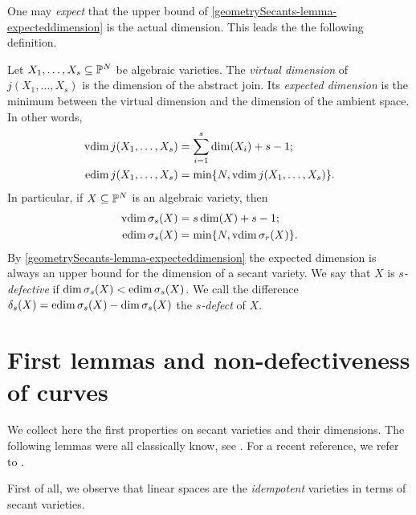 One may {\it expect} that the upper bound of \ref{geometrySecants-lemma-expecteddimension} is the actual dimension. This leads the the following definition. 
\begin{definition}
\label{geometrySecants-definition-expecteddimension}
    Let $X_1, \ldots , X_s \subseteq \mathbb{P}^N$ be algebraic varieties. The {\it virtual dimension} of $j(X_1,\ldots,X_s)$ is the dimension of the abstract join. Its {\it expected dimension} is the minimum between the virtual dimension and the dimension of the ambient space. In other words,
    \begin{align*}
        \operatorname{vdim} j(X_1,\ldots,X_s) & = \sum_{i=1}^s \dim(X_i) + s-1; \\ 
        \operatorname{edim} j(X_1,\ldots,X_s) & = \min \{N,\operatorname{vdim} j(X_1,\ldots,X_s)\}.
    \end{align*}
    In particular, if $X \subseteq \mathbb{P}^N$ is an algebraic variety, then
    \begin{align*}
        \operatorname{vdim} \sigma_s(X) & = s\dim(X) + s-1; \\ 
        \operatorname{edim} \sigma_s(X) & = \min \{N,\operatorname{vdim} \sigma_r(X)\}.
    \end{align*}
By \ref{geometrySecants-lemma-expecteddimension} the expected dimension is always an upper bound for the dimension of a secant variety. We say that $X$ is \emph{$s$-defective} if $\dim \sigma_s(X) < \operatorname{edim}\sigma_s(X)$. We call the difference $\delta_s(X) = \operatorname{edim}\sigma_s(X) - \dim \sigma_s(X)$ the \emph{$s$-defect} of $X$. 

\end{definition}

\section{First lemmas and non-defectiveness of curves}
\label{geometrySecants-section-first_properties}
We collect here the first properties on secant varieties and their dimensions. The following lemmas were all classically know, see \cite{Pal09}. For a recent reference, we refer to \cite{Rus16}.

First of all, we observe that linear spaces are the \emph{idempotent} varieties in terms of secant varieties. 

